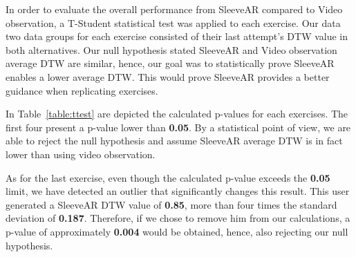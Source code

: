 In order to evaluate the overall performance from SleeveAR compared to Video observation, a T-Student statistical test was applied to each exercise. 
Our data two data groups for each exercise consisted of their last attempt's DTW value in both alternatives.
Our null hypothesis stated SleeveAR and Video observation average DTW are similar, hence, our goal was to statistically prove SleeveAR enables a lower average DTW. 
This would prove SleeveAR provides a better guidance when replicating exercises.

In Table~\ref{table:ttest} are depicted the calculated p-values for each exercises.
The first four present a p-value lower than \textbf{0.05}. 
By a statistical point of view, we are able to reject the null hypothesis and assume SleeveAR average DTW is in fact lower than using video observation.

As for the last exercise, even though the calculated p-value exceeds the \textbf{0.05} limit, we have detected an outlier that significantly changes this result.
This user generated a SleeveAR DTW value of \textbf{0.85}, more than four times the standard deviation of \textbf{0.187}. 
Therefore, if we chose to remove him from our calculations, a p-value of approximately \textbf{0.004} would be obtained, hence, also rejecting our null hypothesis.


\begin{table}[!b]
\centering
{}
\caption{T-Student Test for all exercises. SleeveAR(S), Video(V)}
\label{table:ttest}
\end{table}


